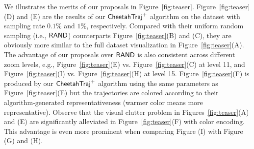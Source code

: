 
We illustrates the merits of our proposals in Figure~\ref{fig:teaser}. Figure~\ref{fig:teaser}(D) and (E) are the results of our $\mathsf{CheetahTraj}^{+}{}$ algorithm on the \pt{} dataset with sampling rate $0.1\%$ and $1\%$, respectively. Compared with their uniform random sampling (i.e., $\mathsf{RAND}$) counterparts Figure~\ref{fig:teaser}(B) and (C), they are obviously more similar to the full dataset visualization in Figure~\ref{fig:teaser}(A). The advantage of our proposals over $\mathsf{RAND}$ is also consistent across different zoom levels, e.g., Figure~\ref{fig:teaser}(E) vs. Figure~\ref{fig:teaser}(C) at level 11, and Figure~\ref{fig:teaser}(I) vs. Figure~\ref{fig:teaser}(H) at level 15. Figure~\ref{fig:teaser}(F) is produced by our $\mathsf{CheetahTraj}^{+}{}$ algorithm using the same parameters as Figure~\ref{fig:teaser}(E) but the trajectories are colored according to their algorithm-generated representativeness (warmer color means more representative). Observe that the visual clutter problem in Figures~\ref{fig:teaser}(A) and (E) are significantly alleviated in Figure~\ref{fig:teaser}(F) with color encoding. This advantage is even more prominent when comparing Figure (I) with Figure (G) and (H).





